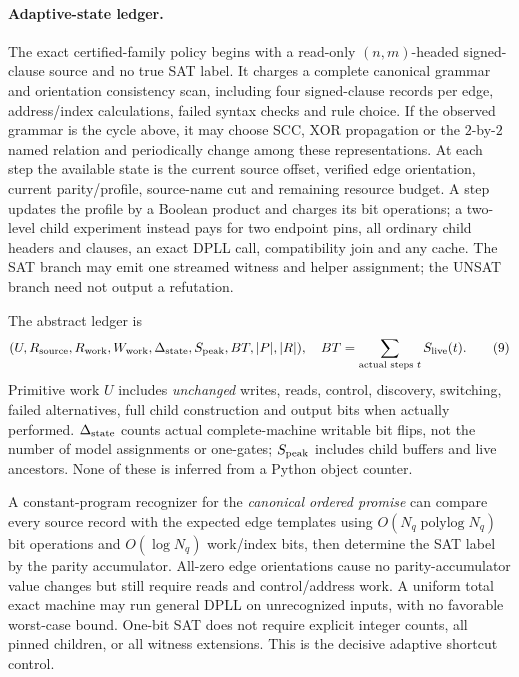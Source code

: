 \documentclass[11pt]{article}
\begin{document}
\paragraph{Adaptive-state ledger.}
The exact certified-family policy begins with a read-only
$(n,m)$-headed signed-clause source and no true SAT label.
It charges a complete canonical grammar and orientation
consistency scan, including four signed-clause records per edge,
address/index calculations, failed syntax checks and rule choice.
If the observed grammar is the cycle above, it may choose
SCC, XOR propagation or the $2$-by-$2$ named relation and
periodically change among these representations. At each step
the available state is the current source offset, verified edge
orientation, current parity/profile, source-name cut and remaining
resource budget. A step updates the profile by a Boolean product
and charges its bit operations; a two-level child experiment
instead pays for two endpoint pins, all ordinary child headers
and clauses, an exact DPLL call, compatibility join and any cache.
The SAT branch may emit one streamed witness and helper assignment;
the UNSAT branch need not output a refutation.

The abstract ledger is
\[
 (U,R_{\rm source},R_{\rm work},W_{\rm work},
  \Delta_{\rm state},S_{\rm peak},
  BT,|P|,|R|),\quad
 BT=\sum_{\text{actual steps }t} S_{\rm live}(t).       \tag{9}
\]
Primitive work $U$ includes \emph{unchanged} writes, reads,
control, discovery, switching, failed alternatives,
full child construction and output bits when actually performed.
$\Delta_{\rm state}$ counts actual complete-machine writable
bit flips, not the number of model assignments or one-gates;
$S_{\rm peak}$ includes child buffers and live ancestors. None
of these is inferred from a Python object counter.

A constant-program recognizer for the \emph{canonical ordered promise}
can compare every source record with the expected edge templates using
$O(N_q\operatorname{polylog}N_q)$ bit operations and $O(\log N_q)$
work/index bits, then determine the SAT label by the parity accumulator.
All-zero edge orientations cause no parity-accumulator value changes
but still require reads and control/address work. A uniform total exact
machine may run general DPLL on unrecognized inputs, with no favorable
worst-case bound. One-bit SAT does not require explicit integer counts,
all pinned children, or all witness extensions. This is the decisive
adaptive shortcut control.
\end{document}
